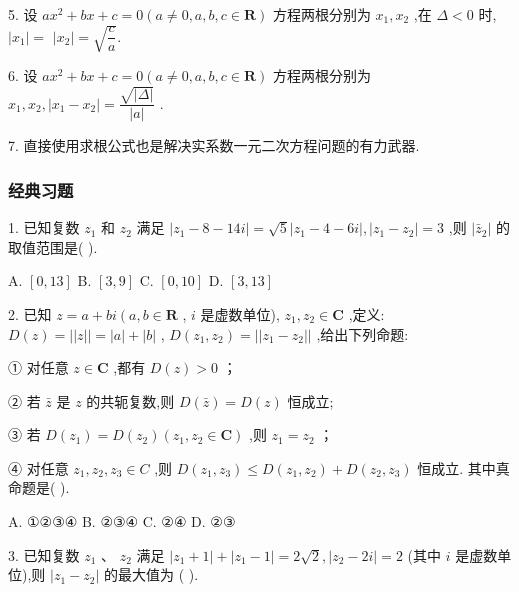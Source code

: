 5. 设 $a{x}^{2} + {bx} + c = 0\left( {a \neq  0,a,b,c \in  \mathbf{R}}\right)$ 方程两根分别为 ${x}_{1},{x}_{2}$ ,在 $\Delta  < 0$ 时, $\left| {x}_{1}\right|  =$  $\left| {x}_{2}\right|  = \sqrt{\dfrac{c}{a}}.$

6. 设 $a{x}^{2} + {bx} + c = 0\left( {a \neq  0,a,b,c \in  \mathbf{R}}\right)$ 方程两根分别为 ${x}_{1},{x}_{2},\left| {{x}_{1} - {x}_{2}}\right|  = \dfrac{\sqrt{\left| \Delta \right| }}{\left| a\right| }$ .

7. 直接使用求根公式也是解决实系数一元二次方程问题的有力武器.

\subsubsection*{经典习题}

1. 已知复数 ${z}_{1}$ 和 ${z}_{2}$ 满足 $\left| {{z}_{1} - 8 - {14}{i}}\right|  = \sqrt{5}\left| {{z}_{1} - 4 - 6{i}}\right| ,\left| {{z}_{1} - {z}_{2}}\right|  = 3$ ,则 $\left| {\bar{z}}_{2}\right|$ 的取值范围是(   ).

A. $\left\lbrack  {0,{13}}\right\rbrack$ B. $\left\lbrack  {3,9}\right\rbrack$ C. $\left\lbrack  {0,{10}}\right\rbrack$ D. $\left\lbrack  {3,{13}}\right\rbrack$

2. 已知 $z = a + b{i}\left( {a,b \in  \mathbf{R}}\right.$ , ${i}$ 是虚数单位), ${z}_{1},{z}_{2} \in  \mathbf{C}$ ,定义: $D\left( z\right)  = \left| \right| z\left| \right|  = \left| a\right|  + \left| b\right|$ , $D\left( {{z}_{1},{z}_{2}}\right)  = \left| \right| {z}_{1} - {z}_{2}\left| \right|$ ,给出下列命题:

① 对任意 $z \in  \mathbf{C}$ ,都有 $D\left( z\right)  > 0$ ；

② 若 $\bar{z}$ 是 $z$ 的共轭复数,则 $D\left( \bar{z}\right)  = D\left( z\right)$ 恒成立;

③ 若 $D\left( {z}_{1}\right)  = D\left( {z}_{2}\right) \left( {{z}_{1},{z}_{2} \in  \mathbf{C}}\right)$ ,则 ${z}_{1} = {z}_{2}$ ；

④ 对任意 ${z}_{1},{z}_{2},{z}_{3} \in  {C}$ ,则 $D\left( {{z}_{1},{z}_{3}}\right)  \leq  D\left( {{z}_{1},{z}_{2}}\right)  + D\left( {{z}_{2},{z}_{3}}\right)$ 恒成立. 其中真命题是(   ).

A. ①②③④ B. ②③④ C. ②④ D. ②③

3. 已知复数 ${z}_{1}\text{ 、 }{z}_{2}$ 满足 $\left| {{z}_{1} + 1}\right|  + \left| {{z}_{1} - 1}\right|  = 2\sqrt{2},\left| {{z}_{2} - 2{i}}\right|  = 2$ (其中 ${i}$ 是虚数单位),则 $\left| {{z}_{1} - {z}_{2}}\right|$ 的最大值为 (   ).

